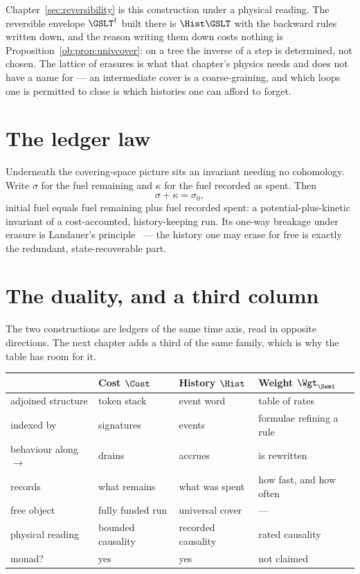 \begin{remark}
\label{ob:rem:hist-forward}
Chapter~\ref{sec:reversibility} is this construction under a physical reading.
The reversible envelope $\GSLT^\dagger$ built there is $\Hist\GSLT$ with the
backward rules written down, and the reason writing them down costs nothing is
Proposition~\ref{ob:prop:univcover}: on a tree the inverse of a step is
determined, not chosen.
The lattice of erasures is what that chapter's physics needs and does not have a
name for --- an intermediate cover is a coarse-graining, and which loops one is
permitted to close is which histories one can afford to forget.
\end{remark}

\section{The ledger law}

Underneath the covering-space picture sits an invariant needing no cohomology. Write
$\sigma$ for the fuel remaining and $\kappa$ for the fuel recorded as spent. Then
\[
  \sigma + \kappa = \sigma_0 ,
\]
initial fuel equals fuel remaining plus fuel recorded spent: a potential-plus-kinetic
invariant of a cost-accounted, history-keeping run. Its one-way breakage under erasure is
Landauer's principle~\cite{Landauer} --- the history one may erase for free is exactly
the redundant, state-recoverable part.

\section{The duality, and a third column}

The two constructions are ledgers of the same time axis, read in opposite directions. The
next chapter adds a third of the same family, which is why the table has room for it.

\begin{center}
\small
\begin{tabular}{@{}llll@{}}
\toprule
& \textbf{Cost $\Cost$} & \textbf{History $\Hist$} & \textbf{Weight $\Wgt_{\Semi}$} \\
\midrule
adjoined structure & token stack & event word & table of rates \\
indexed by         & signatures & events & formulae refining a rule \\
behaviour along $\longrightarrow$ & drains & accrues & is rewritten \\
records            & what remains & what was spent & how fast, and how often \\
free object        & fully funded run & universal cover & --- \\
physical reading   & bounded causality & recorded causality & rated causality \\
monad?             & yes & yes & not claimed \\
\bottomrule
\end{tabular}
\end{center}

